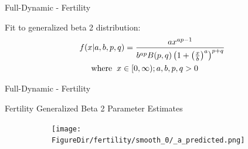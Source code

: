 \documentclass[12pt]{beamer}
\newcommand*{\FigureDir}{../graphs}
\begin{document}
\begin{frame}{Full-Dynamic - Fertility}

	Fit to generalized beta 2 distribution:
	\begin{align*}
		&f(x|a, b, p, q) = \frac{ax^{ap-1}}{b^{ap}B(p,q)\left(1 + \left(\frac{x}{b}\right)^a\right)^{p+q}} \\
		&\hspace{5mm} \text{where} \hspace{2mm} x \in [0,\infty); a, b, p, q > 0   
	 \end{align*}

\end{frame}

\begin{frame}{Full-Dynamic - Fertility}

	\centering
	Fertility Generalized Beta 2 Parameter Estimates
	\vspace{-5mm}
	\begin{table}[H]
	\begin{minipage}[t]{0.33\textwidth}
		\begin{figure}[H]
			\begin{subfigure}{\textwidth}
				\centering
				\texttt{[image: \\FigureDir/fertility/smooth\_0/\_a\_predicted.png]}
				\vspace{-3mm}
				\\ 
			\end{subfigure}


\end{figure}
\end{minipage}
\end{table}
\end{frame}
\end{document}
